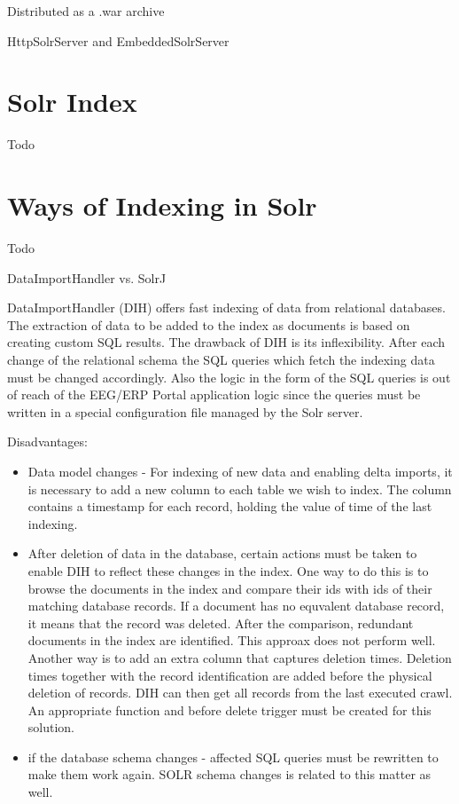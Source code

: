 \documentclass[12pt, oneside, a4paper]{book}
\begin{document}
Distributed as a .war archive

HttpSolrServer and EmbeddedSolrServer




\section{Solr Index}

Todo


\section{Ways of Indexing in Solr}

Todo

DataImportHandler vs. SolrJ

DataImportHandler (DIH) offers fast indexing of data from relational databases. The extraction of data to be added to the index as documents is based on creating custom SQL results. 
The drawback of DIH is its inflexibility. After each change of the relational schema the SQL queries which fetch the indexing data must be changed accordingly. Also the logic in the form of the SQL queries is out of reach of the EEG/ERP Portal application logic since the queries must be written in a special configuration file managed by the Solr server.

Disadvantages:

\begin{itemize}

\item Data model changes - For indexing of new data and enabling delta imports, it is necessary to add a new column to each table we wish to index. The column contains a timestamp for each record, holding the value of time of the last indexing.

\item After deletion of data in the database, certain actions must be taken to enable DIH to reflect these changes in the index. 
One way to do this is to browse the documents in the index and compare their ids with ids of their matching database records. If a document has no equvalent database record, it means that the record was deleted. After the comparison, redundant documents in the index are identified. This approax does not perform well.
Another way is to add an extra column that captures deletion times. Deletion times together with the record identification are added before the physical deletion of records. DIH can then get all records from the last executed crawl. An appropriate function and before delete trigger must be created for this solution. 

\item if the database schema changes - affected SQL queries must be rewritten to make them work again. SOLR schema changes is related to this matter as well. 

\end{itemize}
\end{document}
